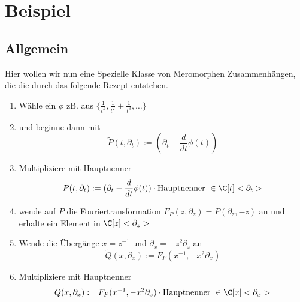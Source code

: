 \chapter{Beispiel}

\section{Allgemein} \label{sec:allgemeinProblem}
\begin{comment}
sei $\phi\in\{\frac{1}{t^k},\frac{1}{t^2}+\frac{1}{t^3},\dots\}$
\begin{enumerate}
\item Starte mit: $P(t,\partial_t):=(\partial_t-\frac{d}{dt}\phi(t)) \cdot
\mbox{Hauptnenner }\in\C[t]<\partial_t>$
\item Furiertrafo: $F_P(z,\partial_z)=P(\partial_z,-z)\in\C[z]<\partial_z>$
\item $x=z^{-1}$ und $\partial_x=-z^2\partial_z$ \\
\[
Q(x,\partial_x):=F_P(x^{-1},-x^2\partial_x)\cdot \mbox{Hauptnenner
}\in\C[x]<\partial_x>
\]
\item Berechne für $Q$ das NP usw...
\end{enumerate}
\end{comment}

Hier wollen wir nun eine Spezielle Klasse von Meromorphen Zusammenhängen, die
die durch das folgende Rezept entstehen.
\begin{enumerate}
\item Wähle ein $\phi$ zB. aus
$\{\frac{1}{t^k},\frac{1}{t^2}+\frac{1}{t^3},\dots\}$
\item und beginne dann mit
\[
\tilde P(t,\partial_t):=(\partial_t-\frac{d}{dt}\phi(t))
\]
\item Multipliziere mit Hauptnenner
\[
P(t,\partial_t):=(\partial_t-\frac{d}{dt}\phi(t)) \cdot
\mbox{Hauptnenner }\in\C[t]<\partial_t>
\]
\item wende auf $P$ die Fouriertransformation 
$F_P(z,\partial_z)=P(\partial_z,-z)$ an und erhalte ein Element
in $\C[z]<\partial_z>$
\item Wende die Übergänge $x=z^{-1}$ und $\partial_x=-z^2\partial_z$ an 
\[
\tilde Q(x,\partial_x):=F_P(x^{-1},-x^2\partial_x)
\]
\item Multipliziere mit Hauptnenner
\[
Q(x,\partial_x):=F_P(x^{-1},-x^2\partial_x)\cdot \mbox{Hauptnenner
}\in\C[x]<\partial_x>
\]
\end{enumerate}

\begin{comment}
warum sind diese wichtig??
\end{comment}

